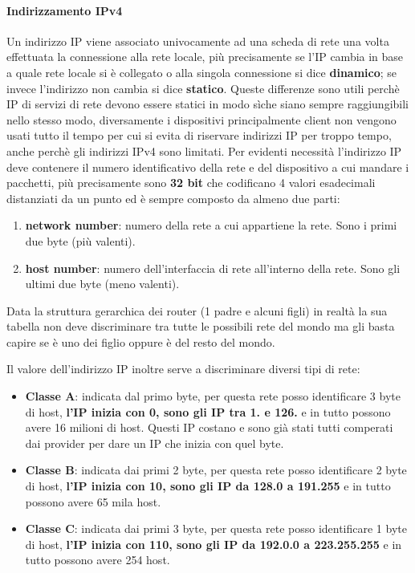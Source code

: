 \documentclass{article}
\begin{document}
\paragraph{Indirizzamento IPv4}
Un indirizzo IP viene associato univocamente ad una scheda di rete una volta
effettuata la connessione alla rete locale, più precisamente se l'IP cambia in
base a quale rete locale si è collegato o alla singola connessione si dice
\textbf{dinamico}; se invece l'indirizzo non cambia si dice \textbf{statico}.
Queste differenze sono utili perchè IP di servizi di rete devono essere statici
in modo sìche siano sempre raggiungibili nello stesso modo, diversamente i
dispositivi principalmente client non vengono usati tutto il tempo per cui si
evita di riservare indirizzi IP per troppo tempo, anche perchè gli indirizzi
IPv4 sono limitati. Per evidenti necessità l'indirizzo IP deve contenere il
numero identificativo della rete e del dispositivo a cui mandare i pacchetti,
più precisamente sono \textbf{32 bit} che codificano 4 valori esadecimali
distanziati da un punto ed è sempre composto da almeno due parti:
\begin{enumerate}
    \item \textbf{network number}: numero della rete a cui appartiene la rete. Sono i primi due byte (più valenti).
    \item \textbf{host number}: numero dell'interfaccia di rete all'interno della rete. Sono gli ultimi due byte (meno valenti).
\end{enumerate}

Data la struttura gerarchica dei router (1 padre e alcuni figli) in realtà la
sua tabella non deve discriminare tra tutte le possibili rete del mondo ma gli
basta capire se è uno dei figlio oppure è del resto del mondo.

Il valore dell'indirizzo IP inoltre serve a discriminare diversi tipi di rete:
\begin{itemize}
    \item \textbf{Classe A}: indicata dal primo byte, per questa rete posso identificare 3 byte di host, \textbf{l'IP inizia con 0, sono gli IP tra 1. e 126.} e in tutto possono avere 16 milioni di host.
          Questi IP costano e sono già stati tutti comperati dai provider per dare un IP che inizia con quel byte.
    \item \textbf{Classe B}: indicata dai primi 2 byte, per questa rete posso identificare 2 byte di host, \textbf{l'IP inizia con 10, sono gli IP da 128.0 a 191.255} e in tutto possono avere 65 mila host.
    \item \textbf{Classe C}: indicata dai primi 3 byte, per questa rete posso identificare 1 byte di host, \textbf{l'IP inizia con 110, sono gli IP da 192.0.0 a 223.255.255} e in tutto possono avere 254 host.
\end{itemize}
\end{document}
